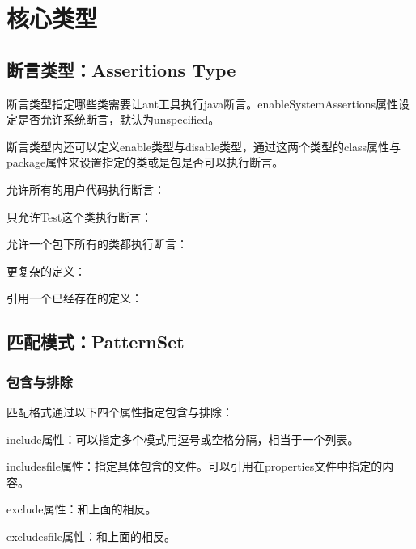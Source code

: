 \chapter{核心类型}

\section{断言类型：Asseritions Type}

	断言类型指定哪些类需要让ant工具执行java断言。enableSystemAssertions属性设定是否允许系统断言，默认为unspecified。

	断言类型内还可以定义enable类型与disable类型，通过这两个类型的class属性与package属性来设置指定的类或是包是否可以执行断言。
	
	允许所有的用户代码执行断言：

	

	只允许Test这个类执行断言：

	

	允许一个包下所有的类都执行断言：

	

	更复杂的定义：

	

	引用一个已经存在的定义：

	

\section{匹配模式：PatternSet}

	\subsection{包含与排除}

		匹配格式通过以下四个属性指定包含与排除：

		include属性：可以指定多个模式用逗号或空格分隔，相当于一个列表。

		includesfile属性：指定具体包含的文件。可以引用在properties文件中指定的内容。

		exclude属性：和上面的相反。

		excludesfile属性：和上面的相反。

